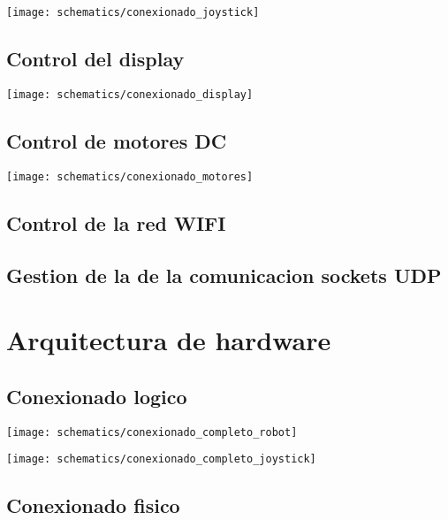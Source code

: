 \vspace{0.5cm}

\begin{center}
  \texttt{[image: schematics/conexionado\_joystick]}
    \label{fig:conexionado_joystick}
    

\end{center}

\subsection{Control del display}
 
\begin{center}
  \texttt{[image: schematics/conexionado\_display]}
    \label{fig:conexionado_display}

\end{center}

\subsection{Control de motores DC}


\begin{center}
  \texttt{[image: schematics/conexionado\_motores]}
    \label{fig:conexionado_motores}

\end{center}

\subsection{Control de la red WIFI}
\subsection{Gestion de la  de la comunicacion sockets UDP}



\section{Arquitectura de hardware}


\subsection{Conexionado logico }


\begin{center}
  \texttt{[image: schematics/conexionado\_completo\_robot]}
    \label{fig:conexionado_completo_robot}
\end{center}



\begin{center}
  \texttt{[image: schematics/conexionado\_completo\_joystick]}
    \label{fig:conexionado_completo_joystick}
\end{center}


\subsection{Conexionado fisico }



